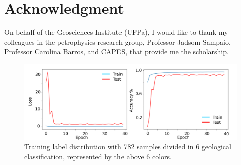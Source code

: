 \documentclass[twoside,letterpaper,twocolumn]{article}
\begin{document}
\section{Acknowledgment} 

On behalf of the Geosciences Institute (UFPa), I would like to thank my colleagues in the petrophysics research group, Professor Jadsom Sampaio, Professor Carolina Barros, and CAPES, that provide me the scholarship.



\begin{figure}[ht!]
	\centering
	\includegraphics[width=18cm]{Figures/loss_accuracy.pdf}
	\caption{Training label distribution with 782 samples divided in 6 geological classification, represented by the above 6 colors.}
	\label{fig:loss_accuracy}
\end{figure}
\end{document}
